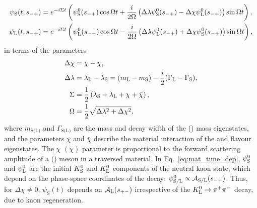 \begin{align} 
\begin{split} \label{eq:mat_time_dep}
\psi_{\rm{S}}(t, s_{-+}) &= e^{-i\Sigma t}\left( \psi^0_{\rm S}(s_{-+})\cos \Omega t  
                + \frac{i}{2\Omega}\left(\Delta \lambda \psi^0_{\rm S}(s_{-+}) - \Delta \chi \psi^0_{\rm L}(s_{-+})\right) \sin \Omega t \right) ,\\
\psi_{\rm{L}}(t, s_{-+}) &= e^{-i\Sigma t}\left( \psi^0_{\rm L}(s_{-+})\cos \Omega t  
                - \frac{i}{2\Omega}\left(\Delta \lambda \psi^0_{\rm L}(s_{-+}) + \Delta \chi \psi^0_{\rm S}(s_{-+})\right) \sin \Omega t \right) ,
\end{split}
\end{align} in terms of the parameters
\begin{align} 
\begin{split}
 \label{eq:mat_param}
\Delta \chi &= \chi - \bar \chi, \\
\Delta \lambda &= \lambda_{\rm L} - \lambda_{\rm S} = (m_{\rm L} - m_{\rm S}) - \frac{i}{2}(\Gamma_{\rm L} - \Gamma_{\rm S}),
\\ 
 \Sigma & = \frac{1}{2}\left(\lambda_{\rm S} + \lambda_{\rm L} + \chi + \bar \chi\right), \\
 \Omega &= \frac{1}{2}\sqrt{\Delta \lambda^2 + \Delta \chi^2},
\end{split}
\end{align}
where $m_\text{S(L)}$ and $\Gamma_\text{S(L)}$ are the mass and decay width of the \KS (\KL) mass eigenstates, and the parameters $\chi$ and $\bar\chi$ describe the material interaction of the \Kz and \Kzb flavour eigenstates. The $\chi$ $(\bar \chi)$ parameter is proportional to the forward scattering amplitude of a \Kz (\Kzb) meson in a traversed material. In Eq.~\eqref{eq:mat_time_dep}, $\psi^0_\text S$ and $\psi^0_\text L$ are the initial ${{{K}^0_{\mathrm{S}}}} $ and ${{{K}^0_{\mathrm{L}}}}$ components of the neutral kaon state, which depend on the phase-space coordinates of the \D decay: $\psi^0_\text {S/L} \propto \mathcal{A}_\text{S/L}(s_{-+})$. Thus, for $\Delta\chi\neq 0$, $\psi_\text{S}(t)$ depends on $\mathcal{A}_\text{L}(s_{+-})$ irrespective of the ${{K}^0_{\mathrm{L}}}\rightarrow\pi^+\pi^-$ decay, due to kaon regeneration.

